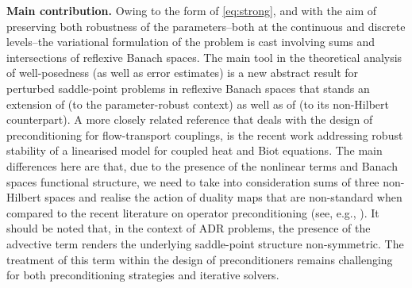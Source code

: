 \documentclass[11pt, reqno, a4paper, twoside]{article}
\newcommand{\rF}{\mathtt{F}}
\numberwithin{equation}{section}
\numberwithin{remark}{section}
\numberwithin{figure}{section}
\numberwithin{table}{section}
\begin{document}
\smallskip
\noindent\textbf{Main contribution.}  
Owing to the form of \eqref{eq:strong}, and  with the aim of preserving both robustness of the parameters--both at the continuous and discrete levels--the variational formulation of the problem is cast involving sums and intersections of reflexive Banach spaces. The main tool in the theoretical analysis of well-posedness (as well as error estimates) is a new abstract result for perturbed saddle-point problems in reflexive Banach spaces that stands an extension of \cite{correa2022continuous} (to the parameter-robust context) as well as of \cite{boon2021robust} (to its non-Hilbert counterpart). 
 A more closely related reference that deals with the design of preconditioning for flow-transport couplings, is the recent work \cite{cai2026parameter} addressing robust stability of a linearised model for coupled heat and Biot equations. The main differences here are that, due to the presence of the nonlinear terms and Banach spaces functional structure, we need to take into consideration sums of three non-Hilbert spaces and realise the action of duality maps that are non-standard when compared to the recent literature on operator preconditioning (see, e.g., \cite{baerland2020observation,cai2026parameter,hong2022robust}). It should be noted that, in the context of ADR problems, the presence of the advective term renders the underlying saddle-point structure non-symmetric. The treatment of this term within the design of preconditioners remains challenging for both preconditioning strategies and iterative solvers. 
 
\end{document}
